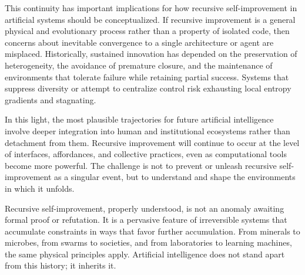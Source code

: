 \documentclass[11pt]{article}
\begin{document}
This continuity has important implications for how recursive self-improvement in artificial systems should be conceptualized. If recursive improvement is a general physical and evolutionary process rather than a property of isolated code, then concerns about inevitable convergence to a single architecture or agent are misplaced. Historically, sustained innovation has depended on the preservation of heterogeneity, the avoidance of premature closure, and the maintenance of environments that tolerate failure while retaining partial success. Systems that suppress diversity or attempt to centralize control risk exhausting local entropy gradients and stagnating.

In this light, the most plausible trajectories for future artificial intelligence involve deeper integration into human and institutional ecosystems rather than detachment from them. Recursive improvement will continue to occur at the level of interfaces, affordances, and collective practices, even as computational tools become more powerful. The challenge is not to prevent or unleash recursive self-improvement as a singular event, but to understand and shape the environments in which it unfolds.

Recursive self-improvement, properly understood, is not an anomaly awaiting formal proof or refutation. It is a pervasive feature of irreversible systems that accumulate constraints in ways that favor further accumulation. From minerals to microbes, from swarms to societies, and from laboratories to learning machines, the same physical principles apply. Artificial intelligence does not stand apart from this history; it inherits it.
\end{document}
